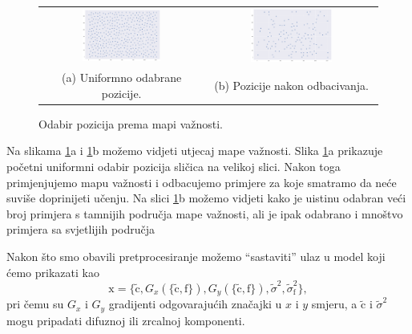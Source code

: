 \documentclass[times, utf8, seminar, numeric]{fer}
\newcommand{\vect}[1]{\bm{\mathrm{#1}}}
\begin{document}
\begin{figure}
\begin{tabular}{cc}
  \includegraphics[width=0.5\textwidth]{uniform_patches.png} &   \includegraphics[width=0.5\textwidth]{pruned_patches.png} \\
  (a) Uniformno odabrane pozicije. & (b) Pozicije nakon odbacivanja. \\[6pt]
\end{tabular}
\caption{Odabir pozicija prema mapi važnosti.}
\label{fig:choosing_positions}
\end{figure}

Na slikama \ref{fig:choosing_positions}a i \ref{fig:choosing_positions}b možemo vidjeti utjecaj
mape važnosti. Slika \ref{fig:choosing_positions}a prikazuje početni uniformni odabir pozicija
sličica na velikoj slici. Nakon toga primjenjujemo mapu važnosti i odbacujemo 
primjere za koje smatramo da neće suviše doprinijeti učenju. Na slici
\ref{fig:choosing_positions}b možemo vidjeti kako je uistinu odabran veći broj primjera s
tamnijih područja mape važnosti, ali je ipak odabrano i mnoštvo primjera sa svjetlijih područja

\begin{samepage}
Nakon što smo obavili pretprocesiranje možemo ``sastaviti'' ulaz u model koji ćemo prikazati kao
$$ \vect{x} = \{ \vect{\tilde{c}}, G_x(\{ \vect{\tilde{c}}, \vect{f} \}),
G_y(\{ \vect{\tilde{c}}, \vect{f} \}), \tilde{\sigma}^2, \tilde{\sigma}^2_{\vect{f}}\}, $$
pri čemu su $G_x$ i $G_y$ gradijenti odgovarajućih značajki u $x$ i $y$ smjeru, a
$\vect{\tilde{c}}$ i $\tilde{\sigma}^2$ mogu pripadati difuznoj ili zrcalnoj komponenti.
\end{samepage}
\end{document}
